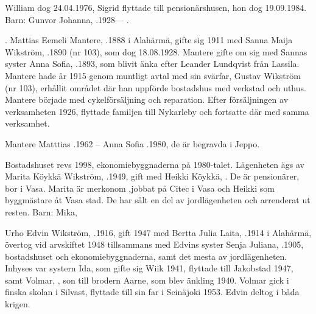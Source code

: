 William dog 24.04.1976, Sigrid flyttade till pensionärshusen, hon dog 19.09.1984.
Barn: Gunvor Johanna, .1928---  .

                    .
Mattias Eemeli Mantere, .1888 i Alahärmä, gifte sig 1911 med Sanna Maija Wikström, .1890 (nr 103), som dog 18.08.1928. Mantere gifte om sig med Sannas syster Anna Sofia, .1893, som blivit änka efter Leander Lundqvist från Lassila. Mantere hade år 1915 genom  muntligt avtal med sin svärfar, Gustav Wikström (nr 103), erhållit området där han uppförde bostadshus med verkstad och uthus. Mantere började med cykelförsäljning och reparation. Efter försäljningen av verksamheten 1926, flyttade familjen till Nykarleby och fortsatte där med samma verksamhet.
\begin{jhchildren}
  \item {}
  \item {}
  \item {}
  \item {}
  \item {}
  \item {}
  \item {}
  \item {}
\end{jhchildren}
Mantere Matttias .1962  --  Anna Sofia .1980, de är begravda i Jeppo.




Bostadshuset revs 1998,  ekonomiebyggnaderna på 1980-talet. Lägenheten ägs av Marita Köykkä Wikström, .1949, gift med Heikki Köykkä, . De är pensionärer, bor i Vasa. Marita är merkonom ,jobbat på Citec i Vasa och Heikki som byggmästare åt Vasa stad. De har sålt en del av jordlägenheten och arrenderat ut resten.
Barn: Mika, 


Urho Edvin Wikström, .1916, gift 1947 med Bertta Julia Laita, .1914 i Alahärmä, övertog vid arvskiftet 1948 tillsammans med Edvins syster Senja Juliana, .1905, bostadshuset och ekonomiebyggnaderna, samt det mesta av jordlägenheten. Inhyses var systern Ida, som gifte sig Wiik 1941, flyttade till Jakobstad 1947, samt Volmar, ,  son till brodern Aarne, som blev änkling 1940. Volmar gick i finska skolan i Silvast, flyttade till sin far i Seinäjoki 1953. Edvin deltog i båda krigen.

